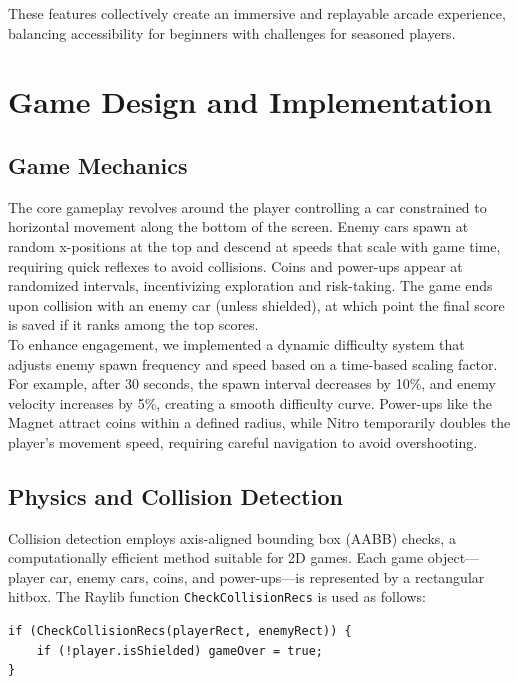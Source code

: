 \documentclass[12pt,a4paper]{article}
\begin{document}
These features collectively create an immersive and replayable arcade experience, balancing accessibility for beginners with challenges for seasoned players.

\section{Game Design and Implementation}

\subsection{Game Mechanics}

The core gameplay revolves around the player controlling a car constrained to horizontal movement along the bottom of the screen. Enemy cars spawn at random x-positions at the top and descend at speeds that scale with game time, requiring quick reflexes to avoid collisions. Coins and power-ups appear at randomized intervals, incentivizing exploration and risk-taking. The game ends upon collision with an enemy car (unless shielded), at which point the final score is saved if it ranks among the top scores. \\

To enhance engagement, we implemented a dynamic difficulty system that adjusts enemy spawn frequency and speed based on a time-based scaling factor. For example, after 30 seconds, the spawn interval decreases by 10\%, and enemy velocity increases by 5\%, creating a smooth difficulty curve. Power-ups like the Magnet attract coins within a defined radius, while Nitro temporarily doubles the player’s movement speed, requiring careful navigation to avoid overshooting. \\

\subsection{Physics and Collision Detection}

Collision detection employs axis-aligned bounding box (AABB) checks, a computationally efficient method suitable for 2D games. Each game object—player car, enemy cars, coins, and power-ups—is represented by a rectangular hitbox. The Raylib function \texttt{CheckCollisionRecs} is used as follows: \\

\begin{verbatim}
if (CheckCollisionRecs(playerRect, enemyRect)) {
    if (!player.isShielded) gameOver = true;
}
\end{verbatim}
\end{document}
